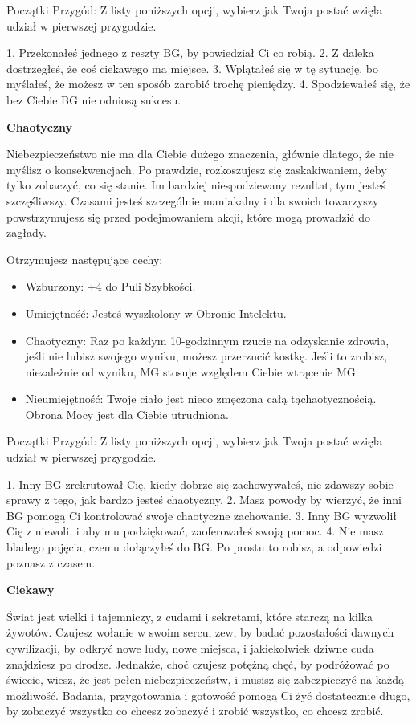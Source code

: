 Początki Przygód: Z listy poniższych opcji, wybierz jak Twoja postać wzięła udział w pierwszej przygodzie.

1. Przekonałeś jednego z reszty BG, by powiedział Ci co robią.
2. Z daleka dostrzegłeś, że coś ciekawego ma miejsce.
3. Wplątałeś się w tę sytuację, bo myślałeś, że możesz w ten sposób zarobić trochę pieniędzy.
4. Spodziewałeś się, że bez Ciebie BG nie odniosą sukcesu.

\textbf{Chaotyczny}

Niebezpieczeństwo nie ma dla Ciebie dużego znaczenia, głównie dlatego, że nie myślisz o konsekwencjach. Po prawdzie, rozkoszujesz się zaskakiwaniem, żeby tylko zobaczyć, co się stanie. Im bardziej niespodziewany rezultat, tym jesteś szczęśliwszy. Czasami jesteś szczególnie maniakalny i dla swoich towarzyszy powstrzymujesz się przed podejmowaniem akcji, które mogą prowadzić do zagłady. 

Otrzymujesz następujące cechy:
\begin{itemize}
 \item Wzburzony: +4 do Puli Szybkości.
 \item Umiejętność: Jesteś wyszkolony w Obronie Intelektu.
 \item Chaotyczny: Raz po każdym 10-godzinnym rzucie na odzyskanie zdrowia, jeśli nie lubisz swojego wyniku, możesz przerzucić kostkę. Jeśli to zrobisz, niezależnie od wyniku, MG stosuje względem Ciebie wtrącenie MG.
\item Nieumiejętność: Twoje ciało jest nieco zmęczona całą tąchaotycznością. Obrona Mocy jest dla Ciebie utrudniona.
\end{itemize}

Początki Przygód: Z listy poniższych opcji, wybierz jak Twoja postać wzięła udział w pierwszej przygodzie.

1. Inny BG zrekrutował Cię, kiedy dobrze się zachowywałeś, nie zdawszy sobie sprawy z tego, jak bardzo jesteś chaotyczny.
2. Masz powody by wierzyć, że inni BG pomogą Ci kontrolować swoje chaotyczne zachowanie.
3. Inny BG wyzwolił Cię z niewoli, i aby mu podziękować, zaoferowałeś swoją pomoc.
4. Nie masz bladego pojęcia, czemu dołączyłeś do BG. Po prostu to robisz, a odpowiedzi poznasz z czasem.

\textbf{Ciekawy}

Świat jest wielki i tajemniczy, z cudami i sekretami, które starczą na kilka żywotów. Czujesz wołanie w swoim sercu, zew, by badać pozostałości dawnych cywilizacji, by odkryć nowe ludy, nowe miejsca, i jakiekolwiek dziwne cuda znajdziesz po drodze. Jednakże, choć czujesz potężną chęć, by podróżować po świecie, wiesz, że jest pełen niebezpieczeństw, i musisz się zabezpieczyć na każdą możliwość. Badania, przygotowania i gotowość pomogą Ci żyć dostatecznie długo, by zobaczyć wszystko co chcesz zobaczyć i zrobić wszystko, co chcesz zrobić.

